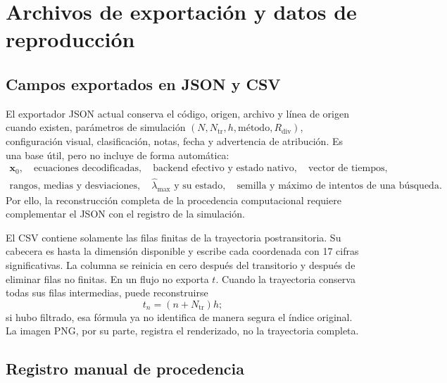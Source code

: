 \section{Archivos de exportación y datos de reproducción}

\subsection{Campos exportados en JSON y CSV}

El exportador JSON actual conserva el código, origen, archivo y línea de origen
cuando existen, parámetros de simulación
\((N,N_{\mathrm{tr}},h,\text{método},R_{\mathrm{div}})\), configuración visual,
clasificación, notas, fecha y advertencia de atribución. Es una base útil, pero no
incluye de forma automática:
\[
\begin{gathered}
\mathbf{x}_0,\quad \text{ecuaciones decodificadas},\quad
\text{backend efectivo y estado nativo},\quad
\text{vector de tiempos},\\
\text{rangos, medias y desviaciones},\quad
\widehat{\lambda}_{\max}\text{ y su estado},\quad
\text{semilla y máximo de intentos de una búsqueda}.
\end{gathered}
\]
Por ello, la reconstrucción completa de la procedencia computacional requiere
complementar el JSON con el registro de la simulación.

El CSV contiene solamente las filas finitas de la trayectoria postransitoria. Su
cabecera es  hasta la dimensión disponible y escribe cada
coordenada con 17 cifras significativas. La columna  se reinicia en cero
después del transitorio y después de eliminar filas no finitas. En un flujo no
exporta \(t\). Cuando la trayectoria conserva todas sus filas intermedias, puede reconstruirse
\[
 t_n=(n+N_{\mathrm{tr}})h;
\]
si hubo filtrado, esa fórmula ya no identifica de manera segura el índice
original. La imagen PNG, por su parte, registra el renderizado, no la trayectoria
completa.

\subsection{Registro manual de procedencia}

